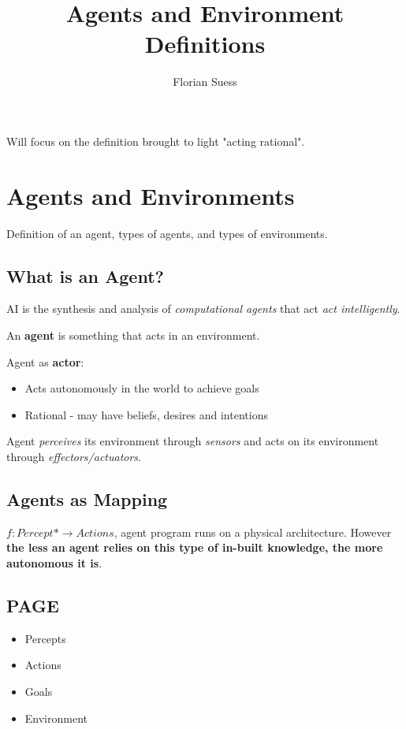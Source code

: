 \documentclass{article}
\begin{document}
\title{Agents and Environment Definitions}
\date{}
\author{Florian Suess}
\maketitle
Will focus on the definition brought to light "acting rational".

\section{Agents and Environments}
Definition of an agent, types of agents, and types of environments. 

\subsection{What is an Agent?}
AI is the synthesis and analysis of \emph{computational agents} that act \emph{act intelligently}.

An \textbf{agent} is something that acts in an environment.

Agent as \textbf{actor}:
\begin{itemize}
	\item Acts autonomously in the world to achieve goals
	\item Rational - may have beliefs, desires and intentions
\end{itemize}

Agent \emph{perceives} its environment through \emph{sensors} and acts on its environment through \emph{effectors/actuators}.

\subsection{Agents as Mapping}
$f : Percept* \rightarrow Actions$, agent program runs on a physical architecture. However \textbf{the less an agent relies on this type of in-built knowledge, the more autonomous it is}.

\subsection{PAGE}
\begin{itemize}
	\item Percepts
	\item Actions
	\item Goals
	\item Environment
\end{itemize}
\end{document}
